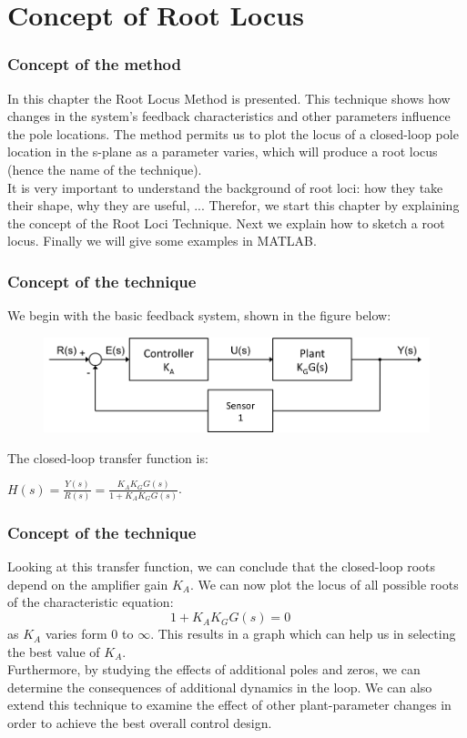 \section{Concept of Root Locus}

\begin{frame}
\frametitle{Concept of the method}
In this chapter the Root Locus Method is presented. This technique shows how changes in the system's feedback characteristics and other parameters influence the pole locations. The method permits us to plot the locus of a closed-loop pole location in the s-plane as a parameter varies, which will produce a root locus (hence the name of the technique).\\
\vspace{1em}
It is very important to understand the background of root loci: how they take their shape, why they are useful, ... Therefor, we start this chapter by explaining the concept of the Root Loci Technique. Next we explain how to sketch a root locus. Finally we will give some examples in MATLAB.
\end{frame}

\begin{frame}
\frametitle{Concept of the technique}
	We begin with the basic feedback system, shown in the figure below:
	\begin{figure}
		\centering
		\includegraphics[width=1\linewidth]{closed_loop_diagram}
	\end{figure}
	The closed-loop transfer function is:
	\begin{center}
		$H(s) = \frac{Y(s)}{R(s)} = \frac{K_AK_GG(s)}{1 + K_AK_GG(s)}$.
	\end{center}
\end{frame}

\begin{frame}
\frametitle{Concept of the technique}
	Looking at this transfer function, we can conclude that the closed-loop roots depend on the amplifier gain $K_A$. We can now plot the locus of all possible roots of the characteristic equation: 
	\begin{equation}
		1 + K_AK_GG(s) = 0 \hspace{1em}
	\end{equation}
	as $K_A$ varies form $0$ to $\infty$. This results in a graph which can help us in selecting the best value of $K_A$.\\
	\vspace{1em}
	Furthermore, by studying the effects of additional poles and zeros, we can determine the consequences of additional dynamics in the loop. We can also extend this technique to examine the effect of other plant-parameter changes in order to achieve the best overall control design.
\end{frame}

